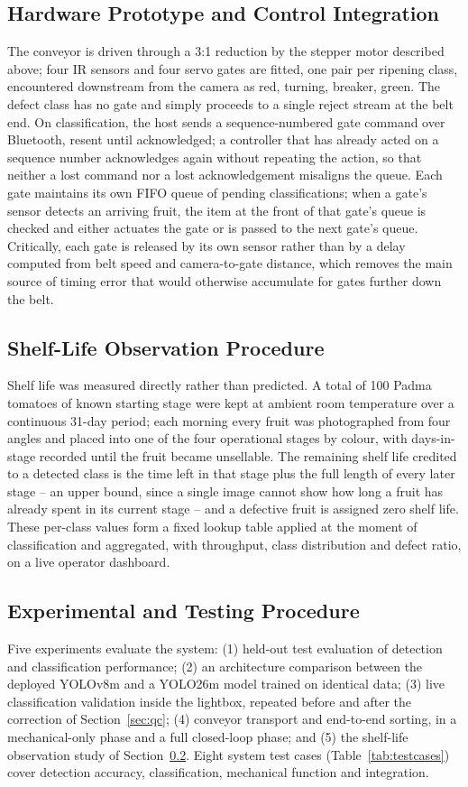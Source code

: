 \documentclass[journal]{IEEEtran}
\begin{document}
\subsection{Hardware Prototype and Control Integration}
The conveyor is driven through a 3:1 reduction by the stepper motor described above; four IR sensors and four servo gates are fitted, one pair per ripening class, encountered downstream from the camera as red, turning, breaker, green. The defect class has no gate and simply proceeds to a single reject stream at the belt end. On classification, the host sends a sequence-numbered gate command over Bluetooth, resent until acknowledged; a controller that has already acted on a sequence number acknowledges again without repeating the action, so that neither a lost command nor a lost acknowledgement misaligns the queue. Each gate maintains its own FIFO queue of pending classifications; when a gate's sensor detects an arriving fruit, the item at the front of that gate's queue is checked and either actuates the gate or is passed to the next gate's queue. Critically, each gate is released by its own sensor rather than by a delay computed from belt speed and camera-to-gate distance, which removes the main source of timing error that would otherwise accumulate for gates further down the belt.

\subsection{Shelf-Life Observation Procedure}
\label{sec:shelflife-method}
Shelf life was measured directly rather than predicted. A total of 100 Padma tomatoes of known starting stage were kept at ambient room temperature over a continuous 31-day period; each morning every fruit was photographed from four angles and placed into one of the four operational stages by colour, with days-in-stage recorded until the fruit became unsellable. The remaining shelf life credited to a detected class is the time left in that stage plus the full length of every later stage -- an upper bound, since a single image cannot show how long a fruit has already spent in its current stage -- and a defective fruit is assigned zero shelf life. These per-class values form a fixed lookup table applied at the moment of classification and aggregated, with throughput, class distribution and defect ratio, on a live operator dashboard.

\subsection{Experimental and Testing Procedure}
Five experiments evaluate the system: (1) held-out test evaluation of detection and classification performance; (2) an architecture comparison between the deployed YOLOv8m and a YOLO26m model trained on identical data; (3) live classification validation inside the lightbox, repeated before and after the correction of Section~\ref{sec:qc}; (4) conveyor transport and end-to-end sorting, in a mechanical-only phase and a full closed-loop phase; and (5) the shelf-life observation study of Section~\ref{sec:shelflife-method}. Eight system test cases (Table~\ref{tab:testcases}) cover detection accuracy, classification, mechanical function and integration.
\end{document}
